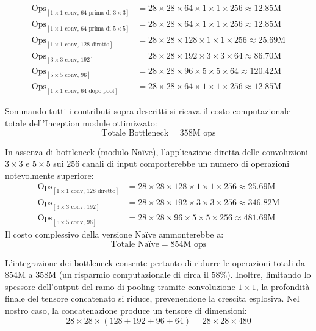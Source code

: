﻿\documentclass[11pt, a4paper]{article}
\begin{document}
\begin{align*}
\text{Ops}_{[1\times1 \text{ conv, } 64 \text{ prima di } 3\times3]} &= 28 \times 28 \times 64 \times 1 \times 1 \times 256 \approx 12.85\text{M} \\
\text{Ops}_{[1\times1 \text{ conv, } 64 \text{ prima di } 5\times5]} &= 28 \times 28 \times 64 \times 1 \times 1 \times 256 \approx 12.85\text{M} \\
\text{Ops}_{[1\times1 \text{ conv, } 128 \text{ diretto}]} &= 28 \times 28 \times 128 \times 1 \times 1 \times 256 \approx 25.69\text{M} \\
\text{Ops}_{[3\times3 \text{ conv, } 192]} &= 28 \times 28 \times 192 \times 3 \times 3 \times 64 \approx 86.70\text{M} \\
\text{Ops}_{[5\times5 \text{ conv, } 96]} &= 28 \times 28 \times 96 \times 5 \times 5 \times 64 \approx 120.42\text{M} \\
\text{Ops}_{[1\times1 \text{ conv, } 64 \text{ dopo pool}]} &= 28 \times 28 \times 64 \times 1 \times 1 \times 256 \approx 12.85\text{M}
\end{align*}

Sommando tutti i contributi sopra descritti si ricava il costo computazionale totale dell'Inception module ottimizzato:
\[ \boxed{\text{Totale Bottleneck} = 358\text{M ops}} \]

In assenza di bottleneck (modulo Naïve), l'applicazione diretta delle convoluzioni $3\times3$ e $5\times5$ sui $256$ canali di input comporterebbe un numero di operazioni notevolmente superiore:
\begin{align*}
\text{Ops}_{[1\times1 \text{ conv, } 128 \text{ diretto}]} &= 28 \times 28 \times 128 \times 1 \times 1 \times 256 \approx 25.69\text{M} \\
\text{Ops}_{[3\times3 \text{ conv, } 192]} &= 28 \times 28 \times 192 \times 3 \times 3 \times 256 \approx 346.82\text{M} \\
\text{Ops}_{[5\times5 \text{ conv, } 96]} &= 28 \times 28 \times 96 \times 5 \times 5 \times 256 \approx 481.69\text{M}
\end{align*}
Il costo complessivo della versione Naïve ammonterebbe a:
\[ \boxed{\text{Totale Naïve} = 854\text{M ops}} \]

L'integrazione dei bottleneck consente pertanto di ridurre le operazioni totali da $854\text{M}$ a $358\text{M}$ (un risparmio computazionale di circa il $58\%$). Inoltre, limitando lo spessore dell'output del ramo di pooling tramite convoluzione $1\times1$, la profondità finale del tensore concatenato si riduce, prevenendone la crescita esplosiva. Nel nostro caso, la concatenazione produce un tensore di dimensioni:
\[ 28 \times 28 \times (128 + 192 + 96 + 64) = 28 \times 28 \times 480 \]
\end{document}
